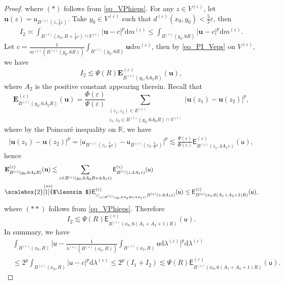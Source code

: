 \documentclass[11pt,a4paper]{article}
\numberwithin{equation}{section}
\theoremstyle{plain}
\theoremstyle{definition}
\begin{document}
\begin{proof}
where $(*)$ follows from \ref{eq_VPhieps}. For any $z\in V^{(\varepsilon)}$, let $\mathbf{u}(z)=\mathsf{u}_{B^{(\varepsilon)}(z,\frac{5}{4}\varepsilon)}$. Take $y_0\in V^{(\varepsilon)}$ such that $d^{(\varepsilon)}(x_0,y_0)<\frac{5}{2}\varepsilon$, then
\begin{align*}
I_2\asymp\int_{B^{(\varepsilon)}(x_0,R+\frac{5}{2}\varepsilon)\cap V^{(\varepsilon)}} \lvert \mathbf{u}-c\rvert^p \mathrm{d}m^{(\varepsilon)}\le\int_{B^{(\varepsilon)}(y_0,6R)} \lvert \mathbf{u}-c\rvert^p \mathrm{d}m^{(\varepsilon)}.
\end{align*}
Let $c=\frac{1}{m^{(\varepsilon)}(B^{(\varepsilon)}(y_0,6R))}\int_{B^{(\varepsilon)}(y_0,6R)}\mathbf{u}\mathrm{d} m^{(\varepsilon)}$, then by \ref{eq_PI_Veps} on $V^{(\varepsilon)}$, we have
$$I_2\lesssim \Psi(R)\mathbf{E}^{(\varepsilon)}_{B^{(\varepsilon)}(y_0,6A_2R)}(\mathbf{u}),$$
where $A_2$ is the positive constant appearing therein. Recall that
$$\mathbf{E}^{(\varepsilon)}_{B^{(\varepsilon)}(y_0,6A_2R)}(\mathbf{u})=\frac{\Phi(\varepsilon)}{\Psi(\varepsilon)}\sum_{\substack{(z_1,z_2)\in E^{(\varepsilon)}\\z_1,z_2\in B^{(\varepsilon)}(y_0,6A_2R)\cap V^{(\varepsilon)}}}\lvert\mathbf{u}(z_1)-\mathbf{u}(z_2)\rvert^p,$$
where by the Poincar\'e inequality on $\mathbb{R}$, we have
\begin{align*}
\lvert \mathbf{u}(z_1)-\mathbf{u}(z_2)\rvert^p=\lvert \mathsf{u}_{B^{(\varepsilon)}(z_1,\frac{5}{4}\varepsilon)}-\mathsf{u}_{B^{(\varepsilon)}(z_2,\frac{5}{4}\varepsilon)}\rvert^p\lesssim \frac{\Psi(\varepsilon)}{\Phi(\varepsilon)}\mathsf{E}^{(\varepsilon)}_{B^{(\varepsilon)}(z_1,4A_1\varepsilon)}(\mathsf{u}),
\end{align*}
hence
\begin{align*}
&\mathbf{E}^{(\varepsilon)}_{B^{(\varepsilon)}(y_0,6A_2R)}(\mathbf{u})\lesssim \sum_{z\in B^{(\varepsilon)}(y_0,6A_2R+4A_1\varepsilon)}\mathsf{E}^{(\varepsilon)}_{B^{(\varepsilon)}(z,4A_1\varepsilon)}(\mathsf{u})\\
&\overset{(**)}{\scalebox{2}[1]{$\lesssim$}}\mathsf{E}^{(\varepsilon)}_{\cup_{{z\in B^{(\varepsilon)}(y_0,6A_2R+4A_1\varepsilon)}}B^{(\varepsilon)}(z,4A_1\varepsilon)}(\mathsf{u})\le\mathsf{E}^{(\varepsilon)}_{B^{(\varepsilon)}(x_0,6(A_1+A_2+1)R)}(\mathsf{u}),
\end{align*}
where $(**)$ follows from \ref{eq_VPhieps}. Therefore
$$I_2\lesssim \Psi(R)\mathsf{E}^{(\varepsilon)}_{B^{(\varepsilon)}(x_0,6(A_1+A_2+1)R)}(\mathsf{u}).$$
In summary, we have
\begin{align*}
&\int_{B^{(\varepsilon)}(x_0,R)}\lvert \mathsf{u}-\frac{1}{\lambda^{(\varepsilon)}(B^{(\varepsilon)}(x_0,R))}\int_{B^{(\varepsilon)}(x_0,R)}\mathsf{u}\mathrm{d}\lambda^{(\varepsilon)}\rvert^p\mathrm{d}\lambda^{(\varepsilon)}\\
&\le2^p\int_{B^{(\varepsilon)}(x_0,R)}\lvert \mathsf{u}-c\rvert^p\mathrm{d}\lambda^{(\varepsilon)}\le2^p \left(I_1+I_2\right)\lesssim \Psi(R)\mathsf{E}^{(\varepsilon)}_{B^{(\varepsilon)}(x_0,6(A_1+A_2+1)R)}(\mathsf{u}).
\end{align*}
\end{proof}
\end{document}
